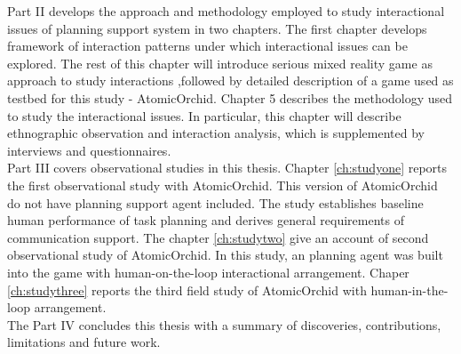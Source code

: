 Part II develops the approach and methodology employed to study interactional issues of planning support system in two chapters. The first chapter develops framework of interaction patterns under which interactional issues can be explored. The rest of this chapter will introduce serious mixed reality game as approach to study interactions  ,followed by detailed description of a game used as testbed for this study - AtomicOrchid. Chapter 5 describes the methodology used to study the interactional issues. In particular, this chapter will describe ethnographic observation and interaction analysis, which is supplemented by interviews and questionnaires. \\ 

Part III covers observational studies in this thesis. Chapter \ref{ch:studyone} reports the first observational study with AtomicOrchid. This version of AtomicOrchid do not have planning support agent included. The study establishes baseline human performance of task planning and derives general requirements of communication support. The chapter \ref{ch:studytwo} give an account of second observational study of AtomicOrchid. In this study, an planning agent was built into the game with human-on-the-loop interactional arrangement. Chaper \ref{ch:studythree} reports the third field study of AtomicOrchid with human-in-the-loop arrangement. \\ 

The Part IV concludes this thesis with a summary of discoveries, contributions, limitations and future work.\\









